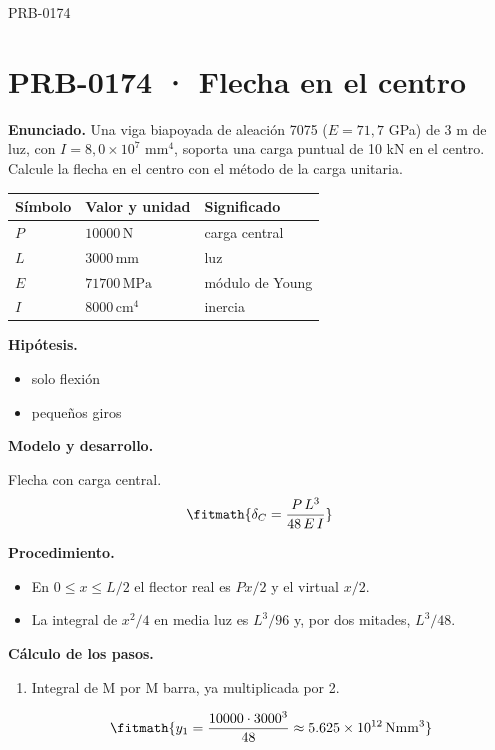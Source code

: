 \begin{studiumworked}{PRB-0174}

\section{PRB-0174 · Flecha en el centro}

\textbf{Enunciado.} Una viga biapoyada de aleación 7075 ($E = 71{,}7$ GPa) de 3 m de luz, con $I = 8{,}0\times 10^{7}$ mm$^4$, soporta una carga puntual de 10 kN en el centro. Calcule la flecha en el centro con el método de la carga unitaria.

\par\medskip\noindent\begin{tabular}{@{}p{.18\linewidth}p{.26\linewidth}p{.48\linewidth}@{}}
\toprule Símbolo & Valor y unidad & Significado\\\midrule
$P$ & $10000\,\mathrm{N}$ & carga central\\
$L$ & $3000\,\mathrm{mm}$ & luz\\
$E$ & $71700\,\mathrm{MPa}$ & módulo de Young\\
$I$ & $8000\,\mathrm{cm^4}$ & inercia\\
\bottomrule\end{tabular}\par\medskip

\textbf{Hipótesis.}\begin{itemize}\item solo flexión
\item pequeños giros\end{itemize}

\textbf{Modelo y desarrollo.}

Flecha con carga central.\[\fitmath{\delta_C = \frac{P\,L^{3}}{48\,E\,I}}\]

\textbf{Procedimiento.}\begin{itemize}\item En $0 \le x \le L/2$ el flector real es $Px/2$ y el virtual $x/2$.
\item La integral de $x^2/4$ en media luz es $L^3/96$ y, por dos mitades, $L^3/48$.\end{itemize}

\textbf{Cálculo de los pasos.}

\begin{enumerate}

\item Integral de M por M barra, ya multiplicada por 2.

\[\fitmath{y_{1}=\frac{10000\cdot {3000}^{3}}{48}\approx 5.625\times10^{12}\,\mathrm{N mm^{3}}}\]


\end{enumerate}
\end{studiumworked}
